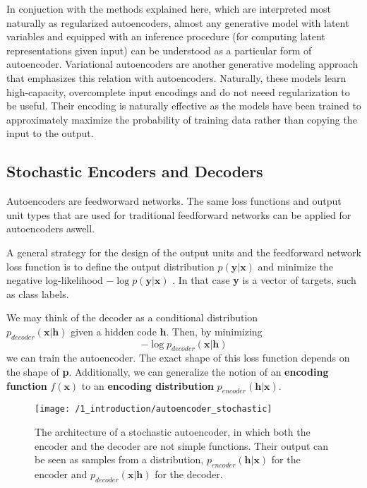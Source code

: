 In conjuction with the methods explained here, which are interpreted most
naturally as regularized autoencoders, almost any generative model with latent
variables and equipped with an inference procedure (for computing latent
representations given input) can be understood as a particular form of
autoencoder. Variational autoencoders are another generative modeling approach
that emphasizes this relation with autoencoders. Naturally, these models learn
high-capacity, overcomplete input encodings and do not neeed regularization to
be useful. Their encoding is naturally effective as the models have been trained
to approximately maximize the probability of training data rather than copying
the input to the output. 

\subsection{Stochastic Encoders and Decoders}
Autoencoders are feedworward networks. The same loss functions and output unit
types that are used for traditional feedforward networks can be applied for
autoencoders aswell.

A general strategy for the design of the output units and the feedforward
network loss function is to define the output distribution
$p(\textbf{y}|\textbf{x})$ and minimize the negative log-likelihood $-\log
p(\textbf{y}|\textbf{x})$ . In that case \textbf{y} is a vector of targets, such
as class labels.

We may think of the decoder as a conditional distribution \\
$p_{decoder}(\textbf{x}|\textbf{h})$ given a hidden code $\textbf{h}$. Then, by
minimizing 
\begin{equation}
    -\log p_{decoder}(\textbf{x}|\textbf{h})
\end{equation}
we can train the autoencoder. The exact shape of this loss function depends on
the shape of \textbf{p}. Additionally, we can generalize the notion of an
\textbf{encoding function} $f(\textbf{x})$ to an \textbf{encoding distribution}
$p_{encoder}(\textbf{h}|\textbf{x})$.

\begin{figure}
	\centering
	\texttt{[image: /1\_introduction/autoencoder\_stochastic]}
    \caption{The architecture of a stochastic autoencoder, in which both the
    encoder and the decoder are not simple functions. Their output can be seen
    as samples from a distribution, $p_{encoder}(\textbf{h}|\textbf{x})$ for the
    encoder and $p_{decoder}(\textbf{x}|\textbf{h})$ for the decoder.} 
	\label{fig:autoencoder}
\end{figure}

